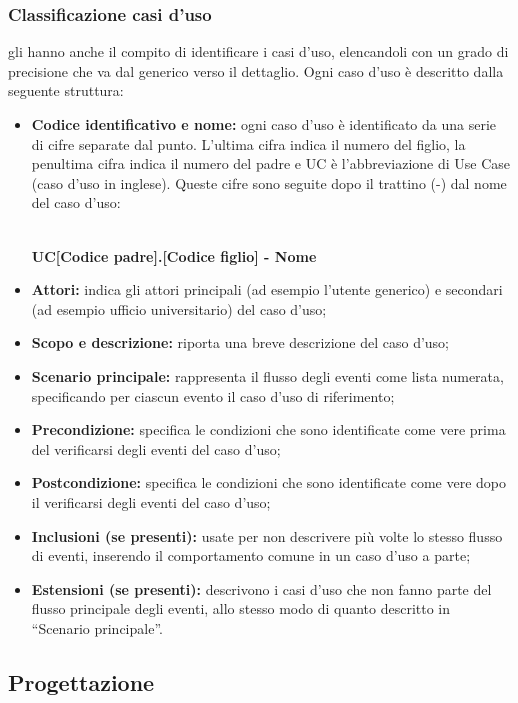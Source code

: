 \documentclass[NormeDiProgetto.tex]{subfiles}
\begin{document}
\subsubsection{Classificazione casi d'uso} gli \alisti hanno anche il compito di identificare i casi d’uso, elencandoli con un grado di precisione che va dal generico verso il dettaglio. Ogni caso d’uso è descritto dalla seguente struttura:\\
\begin{itemize}
	\item \textbf{Codice identificativo e nome:} ogni caso d'uso è identificato da una serie di cifre separate dal punto. L'ultima cifra indica il numero del figlio, la penultima cifra indica il numero del padre e UC è l'abbreviazione di Use Case (caso d'uso in inglese). Queste cifre sono seguite dopo il trattino (-) dal nome del caso d'uso: \\\\
	\centerline{\textbf{UC[Codice padre].[Codice figlio] - Nome}}
	\item \textbf{Attori:} indica gli attori principali (ad esempio l’utente generico) e
	secondari (ad esempio ufficio universitario) del caso d’uso;
	\item \textbf{Scopo e descrizione:} riporta una breve descrizione del caso d’uso;
	\item \textbf{Scenario principale:} rappresenta il flusso degli eventi come lista
	numerata, specificando per ciascun evento il caso d'uso di riferimento;
	\item \textbf{Precondizione:} specifica le condizioni che sono identificate come vere
	prima del verificarsi degli eventi del caso d’uso;
	\item \textbf{Postcondizione:} specifica le condizioni che sono identificate come
	vere dopo il verificarsi degli eventi del caso d’uso;
	\item \textbf{Inclusioni (se presenti):} usate per non descrivere più volte lo stesso flusso di eventi,
	inserendo il comportamento comune in un caso d’uso a parte;
	\item \textbf{Estensioni (se presenti):} descrivono i casi d’uso che non fanno parte del flusso
	principale degli eventi, allo stesso modo di quanto descritto in “Scenario
	principale”.
\end{itemize}

\subsection{Progettazione}
\end{document}
